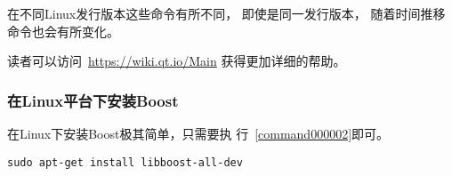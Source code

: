 在不同Linux发行版本这些命令有所不同，
即使是同一发行版本，
随着时间推移命令也会有所变化。

读者可以访问\ \url{https://wiki.qt.io/Main}
获得更加详细的帮助。




\FloatBarrier
\subsubsection{
在Linux平台下安装Boost
}\label{ss000510}



在Linux下安装Boost极其简单，只需要执
行\commandnumbernameone\ \ref{command000002}即可。

\FloatBarrier
{}\label{command000002}    %
\begin{lstlisting}[caption=GoodLuck,
title=\commandnumbernameone\ \thecommandnumber\marginnote{\fbox{\footnotesize{\commandnumbernameone\ \thecommandnumber}}}
]
sudo apt-get install libboost-all-dev
\end{lstlisting}          %
















